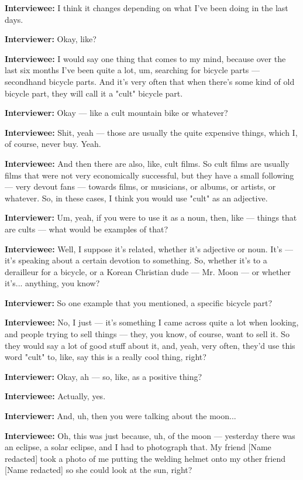\textbf{Interviewee:} I think it changes depending on what I've been doing in the last days.

\textbf{Interviewer:} Okay, like?

\textbf{Interviewee:} I would say one thing that comes to my mind, because over the last six months I've been quite a lot, um, searching for bicycle parts — secondhand bicycle parts. And it's very often that when there's some kind of old bicycle part, they will call it a "cult" bicycle part.

\textbf{Interviewer:} Okay — like a cult mountain bike or whatever?

\textbf{Interviewee:} Shit, yeah — those are usually the quite expensive things, which I, of course, never buy. Yeah.

\textbf{Interviewee:} And then there are also, like, cult films. So cult films are usually films that were not very economically successful, but they have a small following — very devout fans — towards films, or musicians, or albums, or artists, or whatever. So, in these cases, I think you would use "cult" as an adjective.

\textbf{Interviewer:} Um, yeah, if you were to use it as a noun, then, like — things that are cults — what would be examples of that?

\textbf{Interviewee:} Well, I suppose it's related, whether it's adjective or noun. It's — it's speaking about a certain devotion to something. So, whether it's to a derailleur for a bicycle, or a Korean Christian dude — Mr. Moon — or whether it's... anything, you know?

\textbf{Interviewer:} So one example that you mentioned, a specific bicycle part?

\textbf{Interviewee:} No, I just — it's something I came across quite a lot when looking, and people trying to sell things — they, you know, of course, want to sell it. So they would say a lot of good stuff about it, and, yeah, very often, they'd use this word "cult" to, like, say this is a really cool thing, right?

\textbf{Interviewer:} Okay, ah — so, like, as a positive thing?

\textbf{Interviewee:} Actually, yes.

\textbf{Interviewer:} And, uh, then you were talking about the moon...

\textbf{Interviewee:} Oh, this was just because, uh, of the moon — yesterday there was an eclipse, a solar eclipse, and I had to photograph that. My friend [Name redacted] took a photo of me putting the welding helmet onto my other friend [Name redacted] so she could look at the sun, right?

